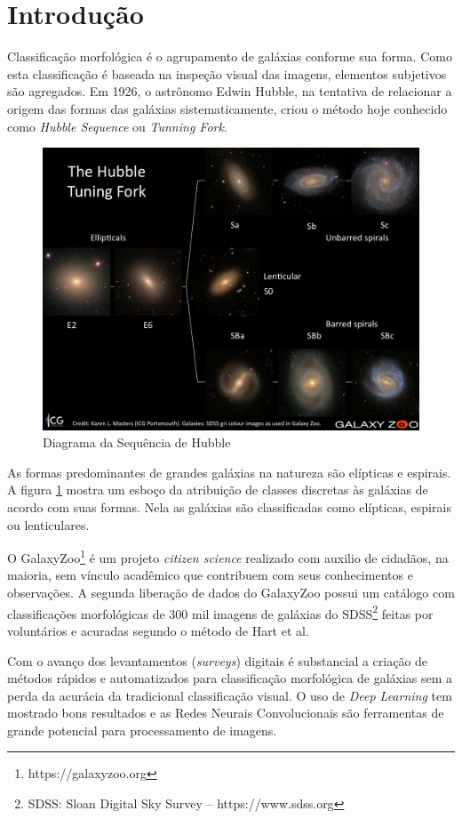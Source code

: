 \section*{Introdução}

Classificação morfológica é o agrupamento de galáxias conforme sua forma. Como esta classificação é baseada na inspeção visual das imagens, elementos subjetivos são agregados. Em 1926, o astrônomo Edwin Hubble, na tentativa de relacionar a origem das formas das galáxias sistematicamente, criou o método hoje conhecido como \emph{Hubble Sequence} ou \emph{Tunning Fork}. \cite{hubble1926, fortson2012}

\begin{figure}[h!]
    \centering
    \includegraphics[width=.8\textwidth]{figures/tuningfork1.jpg}
    \caption{Diagrama da Sequência de Hubble}
    \label{fig:tuningfork}
\end{figure}

As formas predominantes de grandes galáxias na natureza são elípticas e espirais. A figura \ref{fig:tuningfork} mostra um esboço da atribuição de classes discretas às galáxias de acordo com suas formas. Nela as galáxias são classificadas como elípticas, espirais ou lenticulares. \cite{fortson2012}

O GalaxyZoo\footnote{https://galaxyzoo.org} é um projeto \emph{citizen science} realizado com auxilio de cidadãos, na maioria, sem vínculo acadêmico que contribuem com seus conhecimentos e observações. A segunda liberação de dados do GalaxyZoo possui um catálogo com classificações morfológicas de 300 mil imagens de galáxias do SDSS\footnote{SDSS: Sloan Digital Sky Survey -- https://www.sdss.org} feitas por voluntários e acuradas segundo o método de Hart et al. \cite{hart2016}

Com o avanço dos levantamentos (\emph{surveys}) digitais é substancial a criação de métodos rápidos e automatizados para classificação morfológica de galáxias sem a perda da acurácia da tradicional classificação visual. \cite{yamauchi2005} O uso de \emph{Deep Learning} tem mostrado bons resultados e as Redes Neurais Convolucionais são ferramentas de grande potencial para processamento de imagens. \cite{barchi2020, dai2018}

